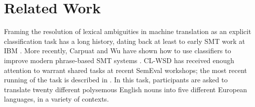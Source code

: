 \documentclass[10pt, a4paper]{article}
\begin{document}

\section{Related Work}
Framing the resolution of lexical ambiguities in machine translation
as an explicit classification
task has a long history, dating back at least to early SMT work at IBM
\cite{Brown91word-sensedisambiguation}.  More recently, Carpuat and Wu have
shown how to use classifiers to improve modern phrase-based SMT systems
\cite{carpuatpsd}.
CL-WSD has received enough attention to warrant shared tasks at recent SemEval
workshops; the most recent running of the task is described in \cite{task10}.
In this task, participants are asked to translate twenty different polysemous
English nouns into five different European languages, in a variety of contexts.
\end{document}
